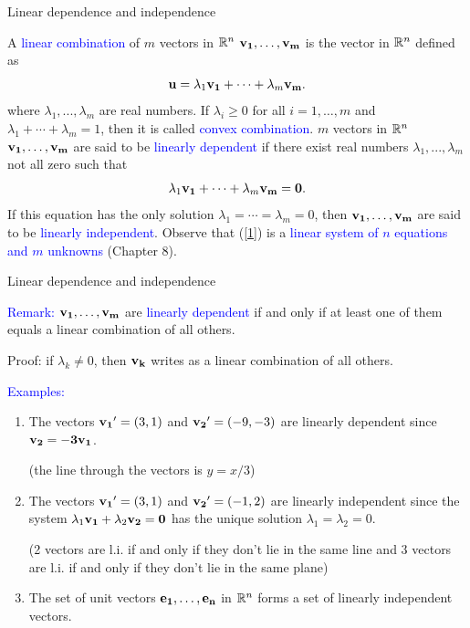 \documentclass[11pt,aspectratio=169]{beamer}
\begin{document}
\begin{frame}{Linear dependence and independence}


A \textcolor{blue}{linear combination} of $m$ vectors in $\mathbb R^n$ ${\bf v_1},\dots, \bf{v}_m$ is the vector in $\mathbb R^n$ defined as
$$
{\bf u}= \lambda_1{\bf  v_1}+\cdots +\lambda_m {\bf v_m}.
$$
where $\lambda_1,...,\lambda_m$ are real numbers.
\vskip 12pt
If $\lambda_i \geq 0$ for all $i=1,\dots,m$ and $\lambda_1+\cdots+\lambda_m=1$, then it is called \textcolor{blue}{convex combination}.
\vskip 12pt
$m$ vectors in $\mathbb R^n$ $\bf{v}_1,\dots, \bf{v}_m$ are said to be \textcolor{blue}{linearly dependent} if there exist real numbers $\lambda_1,...,\lambda_m$ not all zero such that
\begin{equation} \label{1}
 \lambda_1{\bf v_1}+\cdots +\lambda_m {\bf v_m}=\bf{0}.
\end{equation}
If this equation
has the only solution $\lambda_1=\cdots =\lambda_m=0$, then $\bf{v}_1,\dots, \bf{v}_m$ are said to be \textcolor{blue}{linearly independent}.
\vskip 12pt
Observe that (\ref{1}) is a \textcolor{blue}{linear system of $n$ equations and $m$ unknowns} (Chapter 8).
\end{frame}\begin{frame}{Linear dependence and independence}

\textcolor{blue}{Remark:} $\bf{v}_1,\dots, \bf{v}_m$ are \textcolor{blue}{linearly dependent} if and only if at least one of them equals a linear combination of all others.

\begin{tiny}Proof: if $\lambda_k \neq 0$, then $\bf{v}_k$ writes as  a linear combination of all others.\end{tiny}

\vskip 12pt
\textcolor{blue}{Examples:} 
\begin{enumerate}
\item The vectors ${\bf v_1}'=(3,1)$ and ${\bf  v_2}'=(-9,-3)$ are linearly dependent since $\bf{v}_2=-3\bf{v}_1$.\begin{tiny} (the line through the vectors is $y=x/3$)\end{tiny}
\vskip 11pt
\item The vectors ${\bf v_1}'=(3,1)$ and ${\bf v_2}'=(-1,2)$ are linearly independent since the system $\lambda_1 {\bf v_1}+\lambda_2 \bf{v}_2=\bf{0}$ has the unique solution $\lambda_1=\lambda_2=0$.\begin{tiny} (2 vectors are l.i. if and only if they don't lie in the same line and 3 vectors are l.i. if and only if they don't lie in the same plane) \end{tiny}
\vskip 11pt
\item The set of unit vectors $\bf{e}_1, \dots, \bf{e}_n$ in $\mathbb R^n$ forms a set of linearly independent vectors. 
\end{enumerate}\end{frame}
\end{document}
